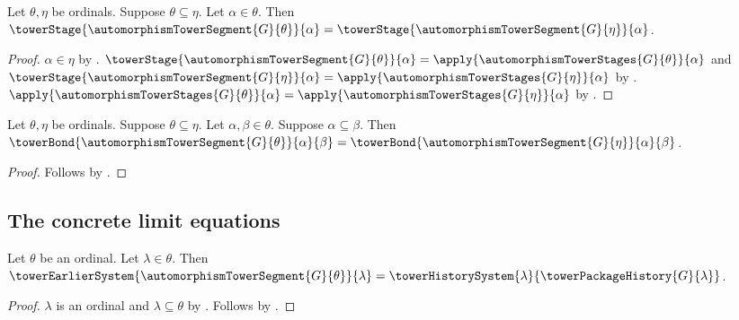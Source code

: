\begin{proposition}\label{automorphism_tower_stage_stability}
    Let $\theta,\eta$ be ordinals.
    Suppose $\theta\subseteq\eta$.
    Let $\alpha\in\theta$.
    Then $\towerStage{\automorphismTowerSegment{G}{\theta}}{\alpha}=
        \towerStage{\automorphismTowerSegment{G}{\eta}}{\alpha}$.
\end{proposition}
\begin{proof}
    $\alpha\in\eta$ by .
    $\towerStage{\automorphismTowerSegment{G}{\theta}}{\alpha}=
        \apply{\automorphismTowerStages{G}{\theta}}{\alpha}$ and
        $\towerStage{\automorphismTowerSegment{G}{\eta}}{\alpha}=
        \apply{\automorphismTowerStages{G}{\eta}}{\alpha}$ by
        .
    $\apply{\automorphismTowerStages{G}{\theta}}{\alpha}=
        \apply{\automorphismTowerStages{G}{\eta}}{\alpha}$ by
        .
\end{proof}

\begin{proposition}\label{automorphism_tower_bond_stability}
    Let $\theta,\eta$ be ordinals.
    Suppose $\theta\subseteq\eta$.
    Let $\alpha,\beta\in\theta$.
    Suppose $\alpha\subseteq\beta$.
    Then $\towerBond{\automorphismTowerSegment{G}{\theta}}
            {\alpha}{\beta}=
        \towerBond{\automorphismTowerSegment{G}{\eta}}
            {\alpha}{\beta}$.
\end{proposition}
\begin{proof}
    Follows by
        .
\end{proof}

\subsection{The concrete limit equations}

\begin{proposition}\label{automorphism_tower_member_earlier_system}
    Let $\theta$ be an ordinal.
    Let $\lambda\in\theta$.
    Then $\towerEarlierSystem{
            \automorphismTowerSegment{G}{\theta}}{\lambda}=
        \towerHistorySystem{\lambda}{\towerPackageHistory{G}{\lambda}}$.
\end{proposition}
\begin{proof}
    $\lambda$ is an ordinal and $\lambda\subseteq\theta$ by
        .
    Follows by .
\end{proof}

